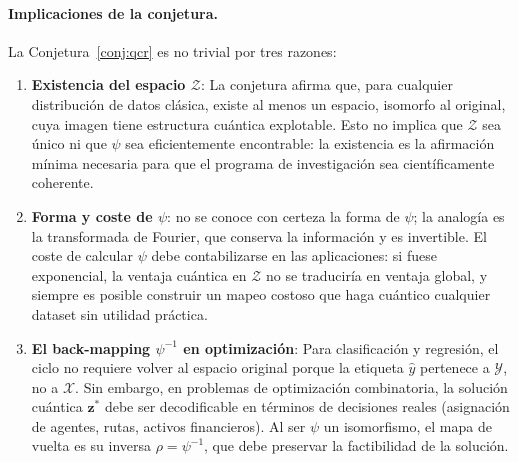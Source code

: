 \paragraph{Implicaciones de la conjetura.}
La Conjetura~\ref{conj:qcr} es no trivial por tres razones:

\begin{enumerate}
  \item \textbf{Existencia del espacio $\mathcal{Z}$}: La conjetura afirma que, para cualquier distribución de datos clásica, existe al menos un espacio, isomorfo al original, cuya imagen tiene estructura cuántica explotable. Esto no implica que $\mathcal{Z}$ sea único ni que $\psi$ sea eficientemente encontrable: la existencia es la afirmación mínima necesaria para que el programa de investigación sea científicamente coherente.

  \item \textbf{Forma y coste de $\psi$}: no se conoce con certeza la forma de $\psi$; la analogía es la transformada de Fourier, que conserva la información y es invertible. El coste de calcular $\psi$ debe contabilizarse en las aplicaciones: si fuese exponencial, la ventaja cuántica en $\mathcal{Z}$ no se traduciría en ventaja global, y siempre es posible construir un mapeo costoso que haga cuántico cualquier dataset sin utilidad práctica.

  \item \textbf{El back-mapping $\psi^{-1}$ en optimización}: Para clasificación y regresión, el ciclo no requiere volver al espacio original porque la etiqueta $\hat{y}$ pertenece a $\mathcal{Y}$, no a $\mathcal{X}$. Sin embargo, en problemas de optimización combinatoria, la solución cuántica $\mathbf{z}^*$ debe ser decodificable en términos de decisiones reales (asignación de agentes, rutas, activos financieros). Al ser $\psi$ un isomorfismo, el mapa de vuelta es su inversa $\rho=\psi^{-1}$, que debe preservar la factibilidad de la solución.
\end{enumerate}

